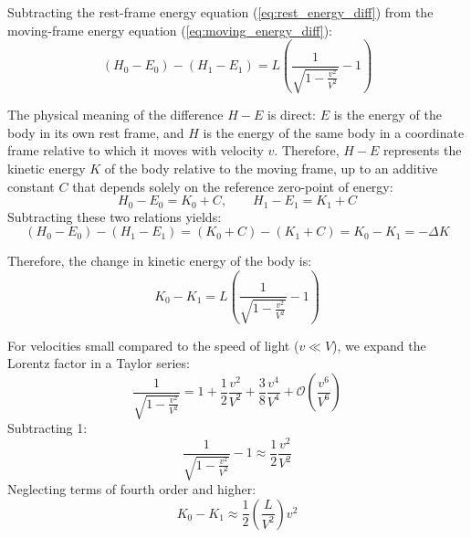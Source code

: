\documentclass[11pt,a4paper]{article}
\begin{document}
Subtracting the rest-frame energy equation (\ref{eq:rest_energy_diff}) from the moving-frame energy equation (\ref{eq:moving_energy_diff}):
\begin{equation}
(H_0 - E_0) - (H_1 - E_1) = L \left( \frac{1}{\sqrt{1 - \frac{v^2}{V^2}}} - 1 \right)
\label{eq:energy_diff_combined}
\end{equation}

The physical meaning of the difference $H - E$ is direct: $E$ is the energy of the body in its own rest frame, and $H$ is the energy of the same body in a coordinate frame relative to which it moves with velocity $v$. Therefore, $H - E$ represents the kinetic energy $K$ of the body relative to the moving frame, up to an additive constant $C$ that depends solely on the reference zero-point of energy:
\begin{equation}
H_0 - E_0 = K_0 + C, \qquad H_1 - E_1 = K_1 + C
\end{equation}
Subtracting these two relations yields:
\begin{equation}
(H_0 - E_0) - (H_1 - E_1) = (K_0 + C) - (K_1 + C) = K_0 - K_1 = -\Delta K
\end{equation}

Therefore, the change in kinetic energy of the body is:
\begin{equation}
K_0 - K_1 = L \left( \frac{1}{\sqrt{1 - \frac{v^2}{V^2}}} - 1 \right)
\label{eq:kinetic_energy_change}
\end{equation}

For velocities small compared to the speed of light ($v \ll V$), we expand the Lorentz factor in a Taylor series:
\begin{equation}
\frac{1}{\sqrt{1 - \frac{v^2}{V^2}}} = 1 + \frac{1}{2}\frac{v^2}{V^2} + \frac{3}{8}\frac{v^4}{V^4} + \mathcal{O}\left(\frac{v^6}{V^6}\right)
\end{equation}
Subtracting 1:
\begin{equation}
\frac{1}{\sqrt{1 - \frac{v^2}{V^2}}} - 1 \approx \frac{1}{2}\frac{v^2}{V^2}
\end{equation}
Neglecting terms of fourth order and higher:
\begin{equation}
K_0 - K_1 \approx \frac{1}{2} \left( \frac{L}{V^2} \right) v^2
\label{eq:taylor_kinetic_result}
\end{equation}
\end{document}
